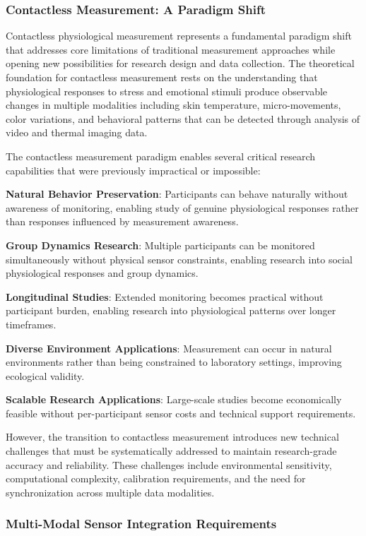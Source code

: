 \documentclass[11pt,a4paper]{article}
\begin{document}
\subsubsection{Contactless Measurement: A Paradigm Shift}

Contactless physiological measurement represents a fundamental paradigm shift that
addresses core limitations of
traditional measurement approaches while opening new possibilities for research
design and data collection.  The
theoretical foundation for contactless measurement rests on the understanding that
physiological responses to stress and
emotional stimuli produce observable changes in multiple modalities including skin
temperature, micro-movements, color
variations, and behavioral patterns that can be detected through
analysis of video and thermal imaging
data.

The contactless measurement paradigm enables several critical research capabilities
that were previously impractical or
impossible:

\textbf{Natural Behavior Preservation}: Participants can behave naturally without awareness of monitoring, enabling study of
genuine physiological responses rather than responses influenced by measurement
awareness.

\textbf{Group Dynamics Research}: Multiple participants can be monitored simultaneously without physical sensor constraints,
enabling research into social physiological responses and group dynamics.

\textbf{Longitudinal Studies}: Extended monitoring becomes practical without participant burden, enabling research into
physiological patterns over longer timeframes.

\textbf{Diverse Environment Applications}: Measurement can occur in natural environments rather than being constrained to
laboratory settings, improving ecological validity.

\textbf{Scalable Research Applications}: Large-scale studies become economically feasible without per-participant sensor
costs and technical support requirements.

However, the transition to contactless measurement introduces new technical
challenges that must be systematically
addressed to maintain research-grade accuracy and reliability.  These challenges
include environmental sensitivity,
computational complexity, calibration requirements, and the need for
synchronization across multiple data
modalities.

\subsubsection{Multi-Modal Sensor Integration Requirements}
\end{document}
